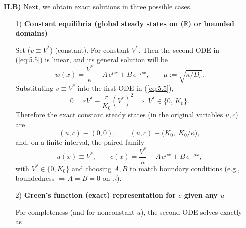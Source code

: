 \documentclass{article}
\newtheorem{corollary}[theorem]{Corollary}
\begin{document}
\begin{description}
\begin{itemize}
\begin{proof}
\begin{itemize}
\end{itemize}
\end{proof}

\begin{corollary}
Propositions \ref{proposition:2} and \ref{proposition:3} show that the distinction introduced by tempering is between \textit{survival at carrying capacity} ($\lambda=0$: $u(t)\to K_0$) and \textit{eventual extinction} ($\lambda>0$: $u(t)\to0$, after a finite transient rise).
\end{corollary}

\item[\textbf{II.B)}] 
Next, we obtain exact solutions in three possible cases.
\begin{itemize}
\item[1)] \textbf{Constant equilibria (global steady states on ($\mathbb{R}$) or bounded domains)}
\par 
 Set ($v\equiv V^*$) (constant). For constant $V^*$. Then the second ODE in (\ref{eq:5.5}) is linear, and its general solution will be
\begin{equation*}
w(x)=\frac{V^*}{\kappa} + A\,e^{\mu x} + B\,e^{-\mu x},\qquad \mu:=\sqrt{\kappa/D_c}.
\end{equation*}
Substituting $v\equiv V^*$ into the first ODE in (\ref{eq:5.5}),
\begin{equation*}
0 = rV^* - \frac{r}{K_0}(V^*)^2 \;\Longrightarrow\; V^*\in\{0,\,K_0\}.
\end{equation*}
Therefore the exact constant steady states (in the original variables $u,c$) are
\begin{equation}\label{eq:6II_B}
(u,c) \equiv (0,0), \qquad (u,c) \equiv \big(K_0,\; K_0/\kappa\big),
\end{equation}
and, on a finite interval, the paired family
\begin{equation*}
u(x)\equiv V^*,\qquad c(x)=\frac{V^*}{\kappa}+A\,e^{\mu x}+B\,e^{-\mu x},
\end{equation*}
with $V^*\in\{0,K_0\}$ and choosing $A,B$ to match boundary conditions (e.g., boundedness $\Rightarrow A=B=0$ on $\mathbb{R}$).
\item[2)] \textbf{Green's function (exact) representation for $c$ given any $u$}
\par 
For completeness (and for nonconstant $u$), the second ODE solves exactly as

\end{itemize}
\end{itemize}
\end{description}
\end{document}
